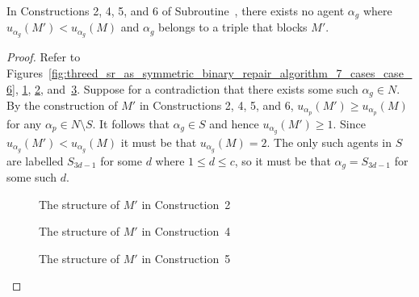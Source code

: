 \begin{lem}
\label{lem:threed_sr_as_symmetric_binary_algocases245and6noalphapexists}
In Constructions 2, 4, 5, and 6 of Subroutine~, there exists no agent $\alpha_{g}$ where $u_{\alpha_{g}}(M') < u_{\alpha_{g}}(M)$ and $\alpha_g$ belongs to a triple that blocks $M'$.
\end{lem}
\begin{proof}
Refer to Figures~\ref{fig:threed_sr_as_symmetric_binary_repair_algorithm_7_cases_case_6}, \ref{fig:threed_sr_as_symmetric_binary_repair_algorithm_7_cases_case_2}, \ref{fig:threed_sr_as_symmetric_binary_repair_algorithm_7_cases_case_4}, and~\ref{fig:threed_sr_as_symmetric_binary_repair_algorithm_7_cases_case_5}. Suppose for a contradiction that there exists some such $\alpha_g\in N$. By the construction of $M'$ in Constructions 2, 4, 5, and 6, $u_{\alpha_p}(M')\geq u_{\alpha_p}(M)$ for any $\alpha_p\in N \setminus S$. It follows that $\alpha_g \in S$ and hence $u_{\alpha_g}(M')\geq 1$. Since $u_{\alpha_{g}}(M') < u_{\alpha_{g}}(M)$ it must be that $u_{\alpha_g}(M) = 2$. The only such agents in $S$ are labelled $S_{3d-1}$ for some $d$ where $1 \leq d \leq c$, so it must be that $\alpha_g = S_{3d-1}$ for some such $d$. 

\begin{figure}
    \centering
    
    \caption{The structure of $M'$ in Construction~2} 
    \label{fig:threed_sr_as_symmetric_binary_repair_algorithm_7_cases_case_2}
\end{figure}

\begin{figure}
    \centering
    
    \caption{The structure of $M'$ in Construction~4} 
    \label{fig:threed_sr_as_symmetric_binary_repair_algorithm_7_cases_case_4}
\end{figure}

\begin{figure}
    \centering
    
    \caption{The structure of $M'$ in Construction~5} 
    \label{fig:threed_sr_as_symmetric_binary_repair_algorithm_7_cases_case_5}
\end{figure}


\end{proof}
